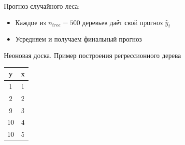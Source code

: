 \documentclass[ignorenonframetext,]{beamer}
\newcommand{\hy}{\hat{y}}
\begin{document}
\begin{frame}{Прогноз случайного леса:}

\begin{itemize}
\item
  Каждое из \(n_{tree}=500\) деревьев даёт свой прогноз \(\hy_i\)
\item
  Усредняем и получаем финальный прогноз
\end{itemize}

\end{frame}

\begin{frame}{Неоновая доска. Пример построения регрессионного дерева}

\begin{longtable}[c]{@{}cc@{}}
\toprule
\begin{minipage}[b]{0.05\columnwidth}\centering\strut
y
\strut\end{minipage} &
\begin{minipage}[b]{0.05\columnwidth}\centering\strut
x
\strut\end{minipage}\tabularnewline
\midrule
\endhead
\begin{minipage}[t]{0.05\columnwidth}\centering\strut
1
\strut\end{minipage} &
\begin{minipage}[t]{0.05\columnwidth}\centering\strut
1
\strut\end{minipage}\tabularnewline
\begin{minipage}[t]{0.05\columnwidth}\centering\strut
2
\strut\end{minipage} &
\begin{minipage}[t]{0.05\columnwidth}\centering\strut
2
\strut\end{minipage}\tabularnewline
\begin{minipage}[t]{0.05\columnwidth}\centering\strut
9
\strut\end{minipage} &
\begin{minipage}[t]{0.05\columnwidth}\centering\strut
3
\strut\end{minipage}\tabularnewline
\begin{minipage}[t]{0.05\columnwidth}\centering\strut
10
\strut\end{minipage} &
\begin{minipage}[t]{0.05\columnwidth}\centering\strut
4
\strut\end{minipage}\tabularnewline
\begin{minipage}[t]{0.05\columnwidth}\centering\strut
10
\strut\end{minipage} &
\begin{minipage}[t]{0.05\columnwidth}\centering\strut
5
\strut\end{minipage}\tabularnewline
\bottomrule
\end{longtable}

\end{frame}
\end{document}
